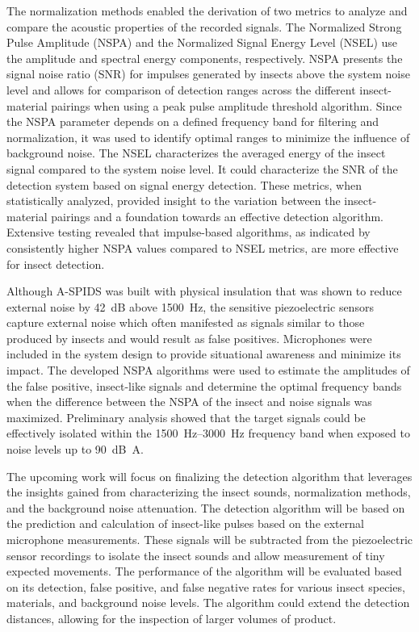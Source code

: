 The normalization methods enabled the derivation of two metrics to analyze and compare the acoustic properties of the recorded signals. The Normalized Strong Pulse Amplitude (NSPA) and the Normalized Signal Energy Level (NSEL) use the amplitude and spectral energy components, respectively. NSPA presents the signal noise ratio (SNR) for impulses generated by insects above the system noise level and allows for comparison of detection ranges across the different insect-material pairings when using a peak pulse amplitude threshold algorithm. Since the NSPA parameter depends on a defined frequency band for filtering and normalization, it was used to identify optimal ranges to minimize the influence of background noise. The NSEL characterizes the averaged energy of the insect signal compared to the system noise level. It could characterize the SNR of the detection system based on signal energy detection. These metrics, when statistically analyzed, provided insight to the variation between the insect-material pairings and a foundation towards an effective detection algorithm. Extensive testing revealed that impulse-based algorithms, as indicated by consistently higher NSPA values compared to NSEL metrics, are more effective for insect detection.

Although A-SPIDS was built with physical insulation that was shown to reduce external noise by \SI{42}{\deci\bel} above \SI{1500}{\hertz}, the sensitive piezoelectric sensors capture external noise which often manifested as signals similar to those produced by insects and would result as false positives. Microphones were included in the system design to provide situational awareness and minimize its impact. The developed NSPA algorithms were used to estimate the amplitudes of the false positive, insect-like signals and determine the optimal frequency bands when the difference between the NSPA of the insect and noise signals was maximized. Preliminary analysis showed that the target signals could be effectively isolated within the \SIrange{1500}{3000}{\hertz} frequency band when exposed to noise levels up to \SI{90}{\deci\bel A}.

The upcoming work will focus on finalizing the detection algorithm that leverages the insights gained from characterizing the insect sounds, normalization methods, and the background noise attenuation. The detection algorithm will be based on the prediction and calculation of insect-like pulses based on the external microphone measurements. These signals will be subtracted from the piezoelectric sensor recordings to isolate the insect sounds and allow measurement of tiny expected movements. The performance of the algorithm will be evaluated based on its detection, false positive, and false negative rates for various insect species, materials, and background noise levels. The algorithm could extend the detection distances, allowing for the inspection of larger volumes of product. 

